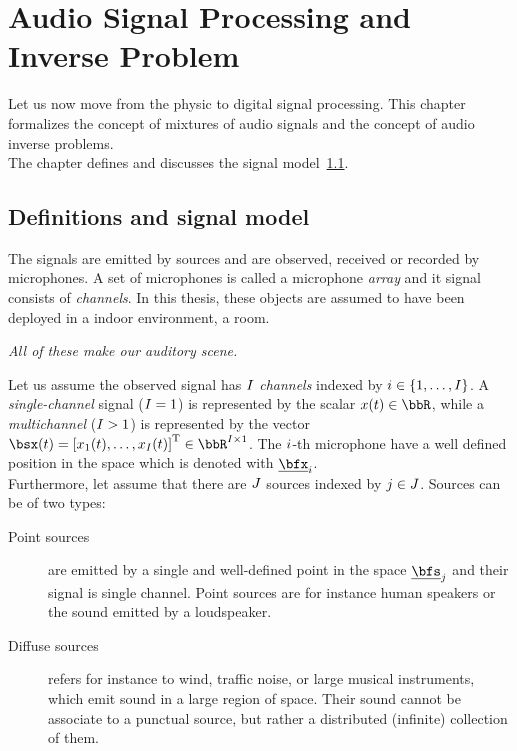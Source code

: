 \chapter{Audio Signal Processing and Inverse Problem}\label{ch:processing}
\vspace{-2.5em}
 Let us now move from the physic to digital signal processing.
This chapter formalizes the concept of mixtures of audio signals and the concept of audio inverse problems.
\\The chapter defines and discusses the signal model~\cref{sec:processing:model}.

\section{Definitions and signal model}\label{sec:processing:model}
The signals are emitted by sources and are observed, received or recorded by microphones.
A set of microphones is called a microphone \textit{array} and it signal consists of \textit{channels}.
In this thesis, these objects are assumed to have been deployed in a indoor environment, a room.
\begin{center}
    \textit{All of these make our \emph{auditory scene}.}
\end{center}
Let us assume the observed signal has $I$ \textit{channels} indexed by $\idxMic \in \kbrace{1,\dots,\numMics}$.
A \textit{single-channel} signal ($I = 1$) is represented by the scalar $\mic(t) \in \R$,
while a \textit{multichannel} ($I >   1$) is represented by the vector
$\mics(t) = \ktranspose{\klist{\mic_1(t), \dots, \mic_{\numMics}(t)}} \in \R^{\numMics \times 1}$.
The $i$-th microphone have a well defined position in the space which is denoted with $\positionMicrophone_\idxMic$.
\\Furthermore, let assume that there are $J$ sources indexed by $j \in J$.
Sources can be of two types:
\begin{description}
    \item[Point sources] are emitted by a single and well-defined point in the space $\positionSource_\idxSrc$ and their signal is single channel.
    Point sources are for instance human speakers or the sound emitted by a loudspeaker.
    \item[Diffuse sources] refers for instance to wind, traffic noise, or large musical instruments, which emit sound in a large region of space.
    Their sound cannot be associate to a punctual source, but rather a distributed (infinite) collection of them.
\end{description}

